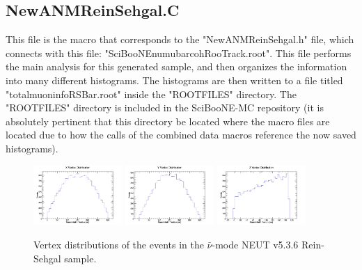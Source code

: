 \documentclass[11pt]{article}
\begin{document}
\subsection{NewANMReinSehgal.C}
\label{sub:NewANMReinSehgal.C}
This file is the macro that corresponds to the "NewANMReinSehgal.h" file, which connects with this file: "SciBooNE\textunderscore numubar\textunderscore coh\textunderscore RooTrack.root". This file performs the main analysis for this generated sample, and then organizes the information into many different histograms. The histograms are then written to a file titled "totalmuoninfoRSBar.root" inside the "ROOTFILES" directory. The "ROOTFILES" directory is included in the SciBooNE-MC repository (it is absolutely pertinent that this directory be located where the macro files are located due to how the calls of the combined data macros reference the now saved histograms).

\begin{figure}[H]
\centering
\includegraphics[width=0.3\textwidth]{NewANMReinSehgalImages/4-XVertexDistributionANMRS.png}
\includegraphics[width=0.3\textwidth]{NewANMReinSehgalImages/3-YVertexDistributionANMRS.png}
\includegraphics[width=0.3\textwidth]{NewANMReinSehgalImages/2-ZVertexDistributionANMRS.png}
\caption{Vertex distributions of the events in the $\bar{\nu}$-mode NEUT v5.3.6 Rein-Sehgal sample.}
\label{fig:app:ANMVertexDistributionRS}
\end{figure}
\end{document}
